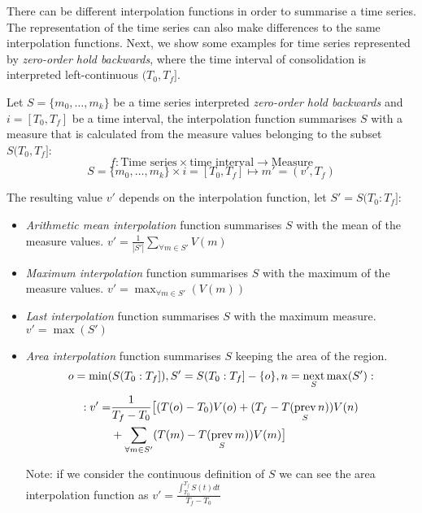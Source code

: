 There can be different interpolation functions in order to summarise a
time series. The representation of the time series can also make
differences to the same interpolation functions. Next, we show some
examples for time series represented by \emph{zero-order hold
  backwards}, where the time interval of consolidation is interpreted
left-continuous $(T_0,T_f]$.


  Let $S=\{m_0,\ldots,m_k\}$ be a time series interpreted
  \emph{zero-order hold backwards} and $i=[T_0,T_f]$ be a time
  interval, the interpolation function summarises $S$ with a measure
  that is calculated from the measure values belonging to the subset
  $S(T_0,T_f]$:
  \[
  f: \text{Time series} \times \text{time interval}
  \longrightarrow \text{Measure}
  \]
  \[
  S=\{m_0,\ldots,m_k\} \times i=[T_0,T_f] \mapsto m'=(v',T_f)
  \]

  The resulting value $v'$ depends on the interpolation function, let
  $S'=S(T_0:T_f]$:

\begin{itemize}

\item \emph{Arithmetic mean interpolation} function summarises $S$
  with the mean of the measure values.
  $
  v' = \frac{1}{|S'|} \sum\limits_{\forall m\in S'} V(m)
  $

\item \emph{Maximum interpolation} function summarises $S$ with the
  maximum of the measure values.
  $
  v' = \max_{\forall m \in S'}(V(m))
  $
\item \emph{Last interpolation} function summarises $S$ with the
  maximum measure.
  $
  v' = \max(S')
  $

\item \emph{Area interpolation} function summarises $S$ keeping the
  area of the region.
  \[
  o=\min(S(T_0:T_f]),
  S'= S(T_0:T_f] - \{o\},
  n=\operatorname*{next}_S \max(S'): 
  \]
  \[
  \begin{split}
  :v'  = & \frac{1}{T_f-T_0} 
  \big[ (T(o)-T_0)V(o) +( T_f- T(\operatorname*{prev}_S n) )V(n) \\
    & {}+\sum\limits_{\forall m \in S'}( T(m)- T(\operatorname*{prev}_S m) )V(m) \big]   
   \end{split}
  \]
  
  Note: if we consider the continuous definition of $S$ we can see the
  area interpolation function as $v' = \frac{\int_{T_0}^{T_f} S(t) dt}{T_f
    - T_0}$

\end{itemize}




